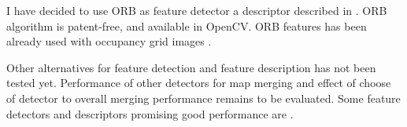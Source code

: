 I have decided to use ORB as feature detector a descriptor described in \cite{Rublee2011}. ORB algorithm is patent-free, and available in OpenCV. ORB features has been already used with occupancy grid images \cite{MapstitchROS} \cite{Andre2014}.

Other alternatives for feature detection and feature description has not been tested yet. Performance of other detectors for map merging and effect of choose of detector to overall merging performance remains to be evaluated. Some feature detectors and descriptors promising good performance are \cite{Alahi2012} \cite{alcantarilla2011fast} \cite{calonder2010brief}.

